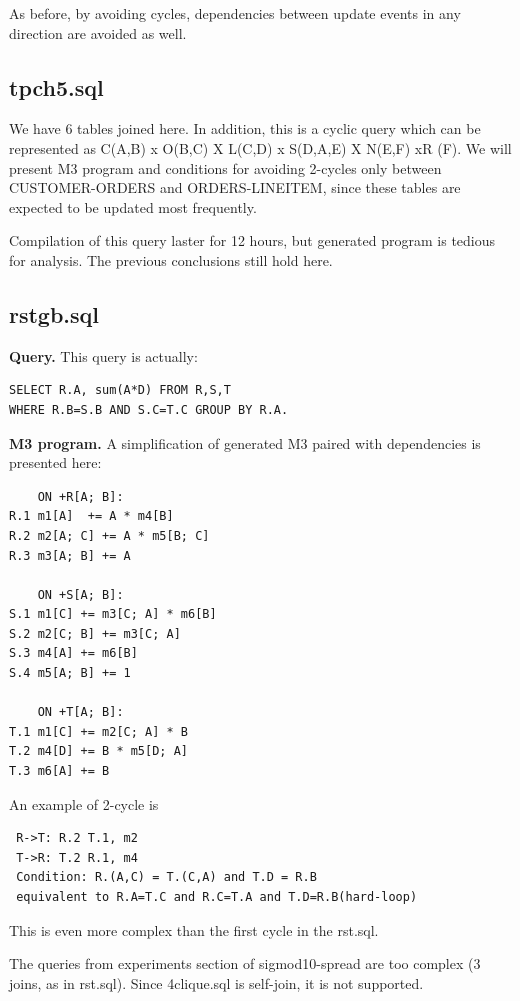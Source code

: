 \documentclass{sig-semester}
\begin{document}
As before, by avoiding cycles, dependencies between update events in any direction are avoided as well.

\subsection{tpch5.sql} We have 6 tables joined here. In addition, this is a cyclic query which can be represented as C(A,B) x O(B,C) X L(C,D) x S(D,A,E) X N(E,F) xR (F). We will present M3 program and conditions for avoiding 2-cycles only between CUSTOMER-ORDERS and ORDERS-LINEITEM, since these tables are expected to be updated most frequently.

Compilation of this query laster for 12 hours, but generated program is tedious for analysis. The previous conclusions still hold here.

\subsection{rstgb.sql}
\textbf{Query.} This query is actually:
\begin{verbatim}
SELECT R.A, sum(A*D) FROM R,S,T 
WHERE R.B=S.B AND S.C=T.C GROUP BY R.A.
\end{verbatim}

\textbf{M3 program.} A simplification of generated M3 paired with dependencies is presented here:
\begin{verbatim}
    ON +R[A; B]: 
R.1 m1[A]  += A * m4[B]
R.2 m2[A; C] += A * m5[B; C]
R.3 m3[A; B] += A

    ON +S[A; B]: 
S.1 m1[C] += m3[C; A] * m6[B]
S.2 m2[C; B] += m3[C; A]
S.3 m4[A] += m6[B]
S.4 m5[A; B] += 1

    ON +T[A; B]: 
T.1 m1[C] += m2[C; A] * B
T.2 m4[D] += B * m5[D; A]
T.3 m6[A] += B
\end{verbatim}

An example of 2-cycle is
\begin{verbatim}
 R->T: R.2 T.1, m2
 T->R: T.2 R.1, m4
 Condition: R.(A,C) = T.(C,A) and T.D = R.B 
 equivalent to R.A=T.C and R.C=T.A and T.D=R.B(hard-loop)
\end{verbatim}
This is even more complex than the first cycle in the rst.sql.

The queries from experiments section of sigmod10-spread are too complex (3 joins, as in rst.sql). Since 4clique.sql is self-join, it is not supported.
\end{document}
